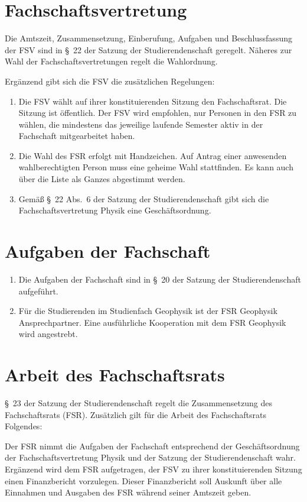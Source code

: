 \documentclass[
a4paper,
12pt,
oneside,
parskip=half-,
pagesize,
headsepline,
german,
ngerman
]{scrartcl}
\begin{document}
	\section{Fachschaftsvertretung}
	Die Amtszeit, Zusammensetzung, Einberufung, Aufgaben und Beschlussfassung der FSV sind in §~22 der Satzung der Studierendenschaft geregelt. Näheres zur Wahl der Fachschaftsvertretungen regelt die Wahlordnung.
	
	Ergänzend gibt sich die FSV die zusätzlichen Regelungen:
	\begin{enumerate}
		\item Die FSV wählt auf ihrer konstituierenden Sitzung den Fachschaftsrat. Die Sitzung ist öffentlich. Der FSV wird empfohlen, nur Personen in den FSR zu wählen, die mindestens das jeweilige laufende Semester aktiv in der Fachschaft mitgearbeitet haben.
		\item Die Wahl des FSR erfolgt mit Handzeichen. Auf Antrag einer anwesenden wahlberechtigten Person muss eine geheime Wahl stattfinden. Es kann auch über die Liste als Ganzes abgestimmt werden.
		\item Gemäß §~22 Abs.~6 der Satzung der Studierendenschaft gibt sich die Fachschaftsvertretung Physik eine Geschäftsordnung.
	\end{enumerate}
	
	\section{Aufgaben der Fachschaft}
	\begin{enumerate}
		\item Die Aufgaben der Fachschaft sind in §~20 der Satzung der Studierendenschaft aufgeführt.
		\item Für die Studierenden im Studienfach Geophysik ist der FSR Geophysik Ansprechpartner. Eine ausführliche Kooperation mit dem FSR Geophysik wird angestrebt.
	\end{enumerate}
	
	\section{Arbeit des Fachschaftsrats}
	§~23 der Satzung der Studierendenschaft regelt die Zusammensetzung des Fachschaftsrats (FSR). Zusätzlich gilt für die Arbeit des Fachschaftsrats Folgendes:
	
	Der FSR nimmt die Aufgaben der Fachschaft entsprechend der Geschäftsordnung der Fachschaftsvertretung Physik und der Satzung der Studierendenschaft wahr. Ergänzend wird dem FSR aufgetragen, der FSV zu ihrer konstituierenden Sitzung einen Finanzbericht vorzulegen. Dieser Finanzbericht soll Auskunft über alle Einnahmen und Ausgaben des FSR während seiner Amtszeit geben.
	
\end{document}
